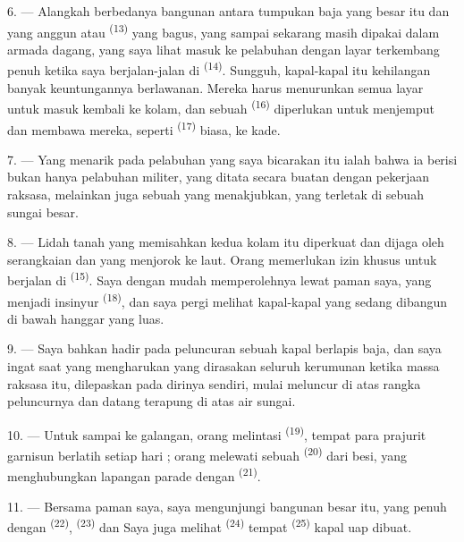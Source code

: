 6. --- Alangkah berbedanya bangunan antara tumpukan baja yang besar
itu dan  yang anggun atau  \textsuperscript{(13)} yang bagus, yang sampai sekarang masih
dipakai dalam armada dagang, yang saya lihat masuk ke pelabuhan dengan
layar terkembang penuh ketika saya berjalan-jalan di 
\textsuperscript{(14)}. Sungguh, kapal-kapal itu kehilangan banyak
keuntungannya   berlawanan. Mereka harus
menurunkan semua layar untuk masuk kembali ke kolam, dan sebuah
 \textsuperscript{(16)} diperlukan untuk menjemput
dan membawa mereka, seperti  \textsuperscript{(17)}
biasa, ke kade.

\VUsaut{3.0mm}
\VUsaut{3.0mm}

7. --- Yang menarik pada pelabuhan yang saya bicarakan itu ialah bahwa
ia berisi bukan hanya pelabuhan militer, yang ditata secara buatan
dengan pekerjaan raksasa, melainkan juga sebuah  yang menakjubkan, yang terletak di  sebuah
sungai besar.

8. --- Lidah tanah yang memisahkan kedua kolam itu diperkuat dan
dijaga oleh serangkaian  dan 
yang menjorok ke laut. Orang memerlukan izin khusus untuk berjalan di
 \textsuperscript{(15)}. Saya dengan mudah
memperolehnya lewat paman saya, yang menjadi insinyur  \textsuperscript{(18)}, dan saya pergi melihat kapal-kapal yang
sedang dibangun di bawah hanggar yang luas.

9. --- Saya bahkan hadir pada peluncuran sebuah kapal berlapis baja,
dan saya ingat saat yang mengharukan yang dirasakan seluruh kerumunan
ketika massa raksasa itu, dilepaskan pada dirinya sendiri, mulai
meluncur di atas rangka peluncurnya dan datang terapung di atas air
sungai.

10. --- Untuk sampai ke galangan, orang melintasi  \textsuperscript{(19)}, tempat para prajurit garnisun berlatih
setiap hari ; orang melewati sebuah 
\textsuperscript{(20)} dari besi, yang menghubungkan lapangan parade
dengan  \textsuperscript{(21)}.

\VUsaut{3.0mm}
\VUsaut{3.0mm}

11. --- Bersama paman saya, saya mengunjungi bangunan besar itu, yang
penuh dengan  \textsuperscript{(22)},  \textsuperscript{(23)} dan  Saya juga
melihat  \textsuperscript{(24)} tempat
 \textsuperscript{(25)} kapal uap dibuat.

